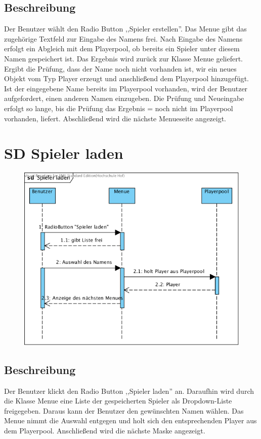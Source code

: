 \subsection{Beschreibung}
Der Benutzer wählt den Radio Button ,,Spieler erstellen''. Das Menue gibt das zugehörige Textfeld zur Eingabe des Namens frei. Nach Eingabe des Namens erfolgt ein Abgleich mit dem Playerpool, ob bereits ein Spieler unter diesem Namen gespeichert ist. Das Ergebnis wird zurück zur Klasse Menue geliefert. Ergibt die Prüfung, dass der Name noch nicht vorhanden ist, wir ein neues Objekt vom Typ Player erzeugt und anschließend dem Playerpool hinzugefügt. Ist der eingegebene Name bereits im Playerpool vorhanden, wird der Benutzer aufgefordert, einen anderen Namen einzugeben. Die Prüfung und Neueingabe erfolgt so lange, bis die Prüfung das Ergebnis = noch nicht im Playerpool vorhanden, liefert. Abschließend wird die nächste Menueseite angezeigt.

\clearpage
\section{SD Spieler laden}
\begin{figure}[h!]
	\centering
    \includegraphics[width=\textwidth]{./SD_Spieler_laden.png}
	\label{layout_gesamt}
\end{figure}
\subsection{Beschreibung}
Der Benutzer klickt den Radio Button ,,Spieler laden'' an. Daraufhin wird durch die Klasse Menue eine Liste der gespeicherten Spieler als Dropdown-Liste freigegeben. Daraus kann der Benutzer den gewünschten Namen wählen. Das Menue nimmt die Auswahl entgegen und holt sich den entsprechenden Player aus dem Playerpool. Anschließend wird die nächste Maske angezeigt.

